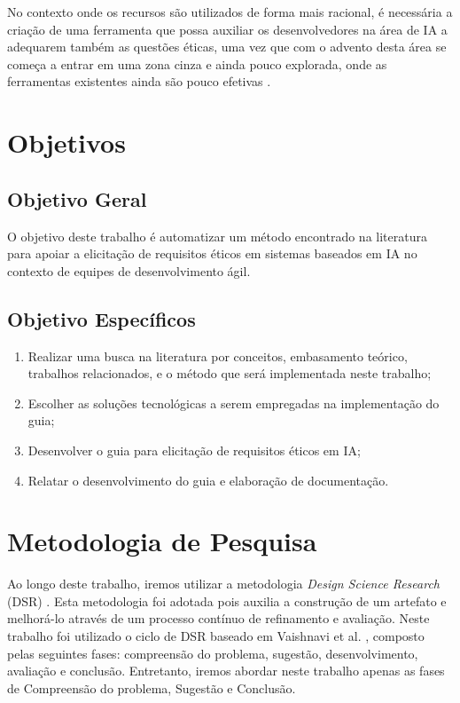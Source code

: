 No contexto onde os recursos são utilizados de forma mais racional, é necessária a criação de uma ferramenta que possa auxiliar os desenvolvedores na área de \acrshort{IA} a adequarem também as questões éticas, uma vez que com o advento desta área se começa a entrar em uma zona cinza e ainda pouco explorada, onde as ferramentas existentes ainda são pouco efetivas \cite{morley2021EthicsAsAService}.

\section{Objetivos}%
\subsection{Objetivo Geral}

O objetivo deste trabalho é automatizar um método encontrado na literatura para apoiar a elicitação de requisitos éticos em sistemas baseados em IA no contexto de equipes de desenvolvimento ágil.

\subsection{Objetivo Específicos}
\begin{enumerate}
    \item Realizar uma busca na literatura por conceitos, embasamento teórico, trabalhos relacionados, e o método que será implementada neste trabalho;
    \item Escolher as soluções tecnológicas a serem empregadas na implementação do guia;
    \item Desenvolver o guia para elicitação de requisitos éticos em IA;
    \item Relatar o desenvolvimento do guia e elaboração de documentação.
\end{enumerate}

\section{Metodologia de Pesquisa}
\label{metodologia}

Ao longo deste trabalho, iremos utilizar a metodologia \textit{Design Science Research} (DSR) \cite{vaishnavi2015design}. Esta metodologia foi adotada pois auxilia a construção de um artefato e melhorá-lo através de um processo contínuo de refinamento e avaliação. Neste trabalho foi utilizado o ciclo de DSR baseado em Vaishnavi et al. \cite{vaishnavi2015design}, composto pelas seguintes fases: compreensão do problema, sugestão, desenvolvimento, avaliação e conclusão. Entretanto, iremos abordar neste trabalho apenas as fases de Compreensão do problema, Sugestão e Conclusão.

